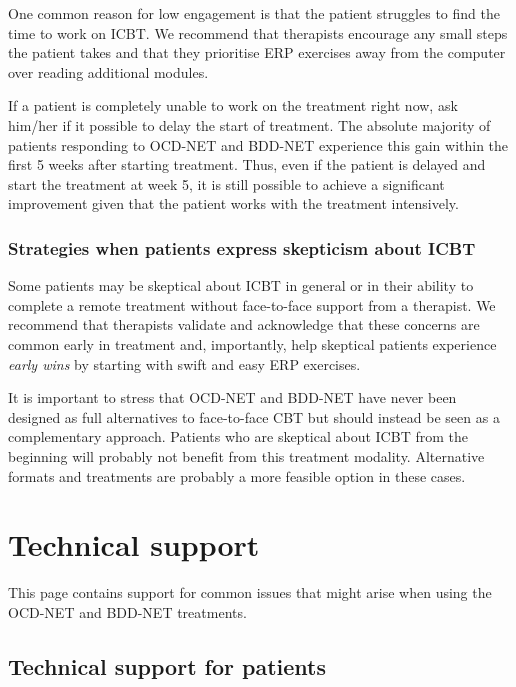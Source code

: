 \documentclass[]{book}
\theoremstyle{definition}
\theoremstyle{definition}
\theoremstyle{definition}
\theoremstyle{remark}
\begin{document}
One common reason for low engagement is that the patient struggles to
find the time to work on ICBT. We recommend that therapists encourage
any small steps the patient takes and that they prioritise ERP exercises
away from the computer over reading additional modules.

If a patient is completely unable to work on the treatment right now,
ask him/her if it possible to delay the start of treatment. The absolute
majority of patients responding to OCD-NET and BDD-NET experience this
gain within the first 5 weeks after starting treatment. Thus, even if
the patient is delayed and start the treatment at week 5, it is still
possible to achieve a significant improvement given that the patient
works with the treatment intensively.

\hypertarget{strategies-when-patients-express-skepticism-about-icbt}{%
\subsection{Strategies when patients express skepticism about
ICBT}\label{strategies-when-patients-express-skepticism-about-icbt}}

Some patients may be skeptical about ICBT in general or in their ability
to complete a remote treatment without face-to-face support from a
therapist. We recommend that therapists validate and acknowledge that
these concerns are common early in treatment and, importantly, help
skeptical patients experience \emph{early wins} by starting with swift
and easy ERP exercises.

It is important to stress that OCD-NET and BDD-NET have never been
designed as full alternatives to face-to-face CBT but should instead be
seen as a complementary approach. Patients who are skeptical about ICBT
from the beginning will probably not benefit from this treatment
modality. Alternative formats and treatments are probably a more
feasible option in these cases.

\hypertarget{technical-support}{%
\chapter{Technical support}\label{technical-support}}

This page contains support for common issues that might arise when using
the OCD-NET and BDD-NET treatments.

\hypertarget{technical-support-for-patients}{%
\section{Technical support for
patients}\label{technical-support-for-patients}}
\end{document}
